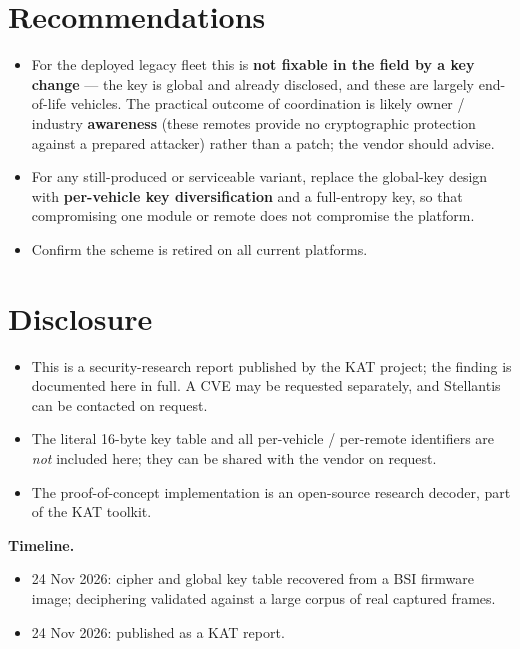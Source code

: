 \documentclass[11pt,a4paper]{article}
\begin{document}
\section{Recommendations}
\begin{itemize}
\item For the deployed legacy fleet this is \textbf{not fixable in the field by a key change} --- the key is global and already disclosed, and these are largely end-of-life vehicles. The practical outcome of coordination is likely owner / industry \textbf{awareness} (these remotes provide no cryptographic protection against a prepared attacker) rather than a patch; the vendor should advise.
\item For any still-produced or serviceable variant, replace the global-key design with \textbf{per-vehicle key diversification} and a full-entropy key, so that compromising one module or remote does not compromise the platform.
\item Confirm the scheme is retired on all current platforms.
\end{itemize}

\section{Disclosure}
\begin{itemize}
\item This is a security-research report published by the KAT project; the finding is documented here in full. A CVE may be requested separately, and Stellantis can be contacted on request.
\item The literal 16-byte key table and all per-vehicle / per-remote identifiers are \emph{not} included here; they can be shared with the vendor on request.
\item The proof-of-concept implementation is an open-source research decoder, part of the KAT toolkit.
\end{itemize}

\noindent\textbf{Timeline.}
\begin{itemize}
\item 24 Nov 2026: cipher and global key table recovered from a BSI firmware image; deciphering validated against a large corpus of real captured frames.
\item 24 Nov 2026: published as a KAT report.
\end{itemize}
\end{document}
